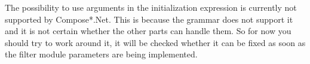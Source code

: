 The possibility to use arguments in the initialization expression is currently not supported
by Compose*.Net. This is because the grammar does not support it and it is not certain whether
the other parts can handle them. So for now you should try to work around it, it will be
checked whether it can be fixed as soon as the filter module parameters are being implemented.
